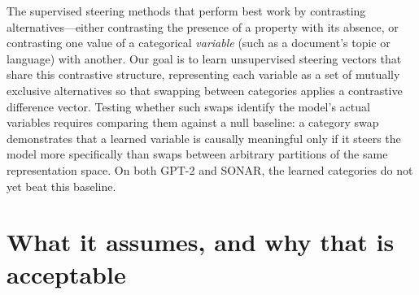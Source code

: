 \documentclass[11pt]{article}
\begin{document}
The supervised steering methods that perform best work by contrasting
alternatives---either contrasting the presence of a property with its
absence, or contrasting one value of a categorical \emph{variable} (such
as a document's topic or language) with another. Our goal is to learn
unsupervised steering vectors that share this contrastive structure,
representing each variable as a set of mutually exclusive alternatives so
that swapping between categories applies a contrastive difference vector.
Testing whether such swaps identify the model's actual variables requires
comparing them against a null baseline: a category swap demonstrates that
a learned variable is causally meaningful only if it steers the model more
specifically than swaps between arbitrary partitions of the same
representation space. On both GPT-2 and SONAR, the learned categories do
not yet beat this baseline.

\section*{What it assumes, and why that is acceptable}
\end{document}
